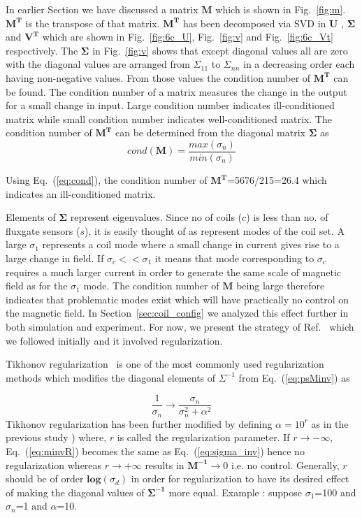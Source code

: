 In earlier Section we have discussed a matrix $\bm{M}$ which is shown in Fig.~\ref{fig:m}. $\bm{M^T}$ is the transpose of that matrix. $\bm{M^T}$ has been decomposed via SVD in $\bm{U}$ , $\bm{\Sigma}$ and $\bm{V^T}$ which are shown in Fig.~\ref{fig:6c_U}, Fig.~\ref{fig:v} and Fig.~\ref{fig:6c_Vt} respectively. The $\bm{\Sigma}$ in Fig.~\ref{fig:v} shows that except diagonal values all are zero with the diagonal values are arranged from $\Sigma_{11}$ to $\Sigma_{nn}$ in a decreasing order each having non-negative values. From those values the condition number of $\bm{M^T}$  can be found. The condition number of a matrix measures the change in the output for a small change in input. Large condition number indicates ill-conditioned matrix while small condition number indicates well-conditioned matrix. The condition number of $\bm{M^T}$ can be determined from the diagonal matrix $\bm{\Sigma}$ as 
 \begin{equation}\label{eq:cond}
     cond(\bm{M})=\frac{max(\sigma_n)}{min(\sigma_n)}
 \end{equation}
 
Using Eq.~(\ref{eq:cond}), the condition number of $\bm{M^T}$=5676/215=26.4 which indicates an ill-conditioned matrix.

Elements of $\bm{\Sigma}$ represent eigenvalues. Since no of coils ($c$) is less than no. of fluxgate sensors ($s$), it is easily thought of as represent modes of the coil set. A large $\sigma_1$ represents a coil mode where a small change in current gives rise to a large change in field. If $\sigma_c<<\sigma_1$ it means that mode corresponding to  $\sigma_c$ requires a much larger current in order to generate the same scale of magnetic field as for the $\sigma_1$ mode. The condition number of $\bm{M}$ being large therefore indicates that problematic modes exist which will have practically no control on the magnetic field. In Section~\ref{sec:coil_config} we analyzed this effect further in both simulation and experiment. For now, we present the strategy of Ref.~\cite{bea} which we followed initially and it involved regularization.

Tikhonov regularization~\cite{tikhonov2013numerical,tikhonov_book,svd,svd3} is one of the most commonly used regularization methods which modifies the diagonal elements of $\Sigma^{-1}$ from Eq.~(\ref{eq:psMinv}) as

\begin{equation}\label{eq:minvR}
    \frac{1}{\sigma_n} \rightarrow \frac{\sigma_n}{\sigma_n^2+\alpha^2} 
\end{equation}
Tikhonov regularization has been further modified by defining $\alpha=10^r$ as in the previous study \cite{bea}) where, $r$ is called the regularization parameter. If  $r \rightarrow - \infty$, Eq.~(\ref{eq:minvR}) becomes the same as Eq.~(\ref{eq:sigma_inv}) hence no regularization whereas $r \rightarrow + \infty$ results in $\bm{M^{-1}} \rightarrow 0$ i.e. no control. Generally, $r$ should be of order $\mathbf{log}(\sigma_{d})$ in order for regularization to have its desired effect of making the diagonal values of $\bm{\Sigma^{-1}}$ more equal. Example : suppose $\sigma_1$=100 and $\sigma_n$=1 and $\alpha$=10.

